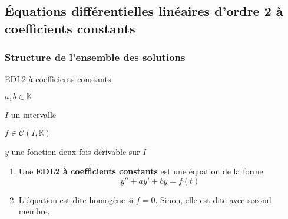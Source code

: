 \subsection{Équations différentielles linéaires d’ordre 2 à coefficients constants}

    \subsubsection{Structure de l’ensemble des solutions}

    \begin{defi}{EDL2 à coefficients constants}{}
	    \begin{soient}
		    \item $a,b \in \mathbb{K}$
		    \item $I$ un intervalle
		    \item $f \in \mathcal{C}(I,\mathbb{K})$
		    \item $y$ une fonction deux fois dérivable sur $I$
	    \end{soient}
	    \begin{enumerate}
		    \item Une \textbf{EDL2 à coefficients constants} est une équation de la forme \[ y'' + ay' + by = f(t) \]
		    \item L’équation est dite homogène si $f = 0$. Sinon, elle est dite avec second membre.
	    \end{enumerate}
    \end{defi}

